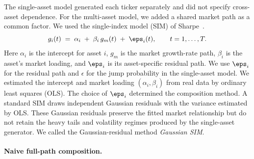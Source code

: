 
The single-asset model generated each ticker separately and did not
specify cross-asset dependence. For the multi-asset model, we added a
shared market path as a common factor. We used the single-index model
(SIM) of Sharpe~\cite{sharpe1963}.
\begin{equation}
  g_i(t) \;=\; \alpha_i \;+\; \beta_i\, g_m(t) \;+\; \eps_i(t),
  \qquad t = 1,\dots,T.
  \label{eq:sim-composition}
\end{equation}
Here $\alpha_i$ is the intercept for asset $i$, $g_m$ is the market
growth-rate path, $\beta_i$ is the asset's market loading, and
$\eps_i$ is its asset-specific residual path. We use $\eps_i$ for the
residual path and $\epsilon$ for the jump probability in the
single-asset model. We estimated the intercept and market loading
$(\alpha_i,\beta_i)$ from real data by
ordinary least squares (OLS). The choice of $\eps_i$ determined the
composition method. A standard SIM draws independent Gaussian residuals
with the variance estimated by OLS. These Gaussian residuals preserve
the fitted market relationship but do not retain the heavy tails and
volatility regimes produced by the single-asset generator. We called
the Gaussian-residual method \emph{Gaussian SIM}.

\paragraph{Naive full-path composition.}

